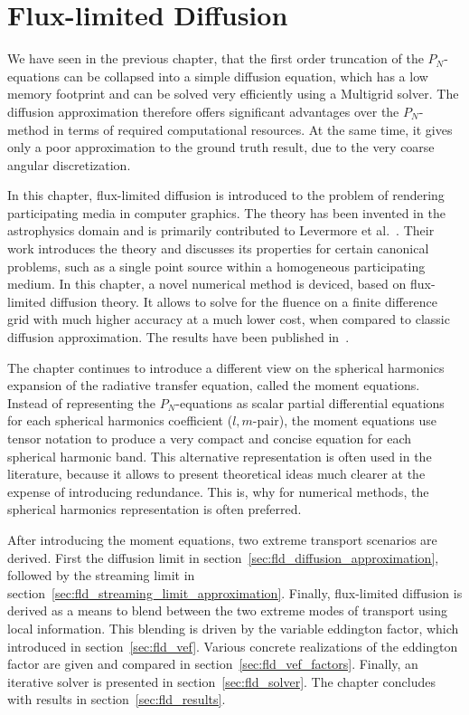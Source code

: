 \chapter{Flux-limited Diffusion}
\label{sec:fld}

We have seen in the previous chapter, that the first order truncation of the $P_N$-equations can be collapsed into a simple diffusion equation, which has a low memory footprint and can be solved very efficiently using a Multigrid solver. The diffusion approximation therefore offers significant advantages over the $P_N$-method in terms of required computational resources. At the same time, it gives only a poor approximation to the ground truth result, due to the very coarse angular discretization.

In this chapter, flux-limited diffusion is introduced to the problem of rendering participating media in computer graphics. The theory has been invented in the astrophysics domain and is primarily contributed to Levermore et al.~\cite{Levermore81}. Their work introduces the theory and discusses its properties for certain canonical problems, such as a single point source within a homogeneous participating medium. In this chapter, a novel numerical method is deviced, based on flux-limited diffusion theory. It allows to solve for the fluence on a finite difference grid with much higher accuracy at a much lower cost, when compared to classic diffusion approximation. The results have been published in~\cite{Koerner14}.

The chapter continues to introduce a different view on the spherical harmonics expansion of the radiative transfer equation, called the moment equations. Instead of representing the $P_N$-equations as scalar partial differential equations for each spherical harmonics coefficient ($l,m$-pair), the moment equations use tensor notation to produce a very compact and concise equation for each spherical harmonic band. This alternative representation is often used in the literature, because it allows to present theoretical ideas much clearer at the expense of introducing redundance. This is, why for numerical methods, the spherical harmonics representation is often preferred.

After introducing the moment equations, two extreme transport scenarios are derived. First the diffusion limit in section~\ref{sec:fld_diffusion_approximation}, followed by the streaming limit in section~\ref{sec:fld_streaming_limit_approximation}. Finally, flux-limited diffusion is derived as a means to blend between the two extreme modes of transport using local information. This blending is driven by the variable eddington factor, which introduced in section~\ref{sec:fld_vef}. Various concrete realizations of the eddington factor are given and compared in section~\ref{sec:fld_vef_factors}. Finally, an iterative solver is presented in section~\ref{sec:fld_solver}. The chapter concludes with results in section~\ref{sec:fld_results}.


